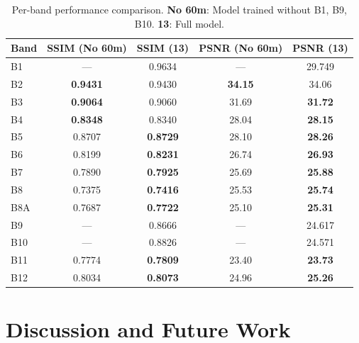\documentclass[remotesensing,article,submit,pdftex,moreauthors]{Definitions/mdpi}
\begin{document}
\begin{table}[!htbp]
    \centering
    \caption{Per-band performance comparison. \textbf{No 60m}: Model trained without B1, B9, B10. \textbf{13}: Full model.}
    \label{tab:ablation_excluding_60m_per_band}
    \begin{tabular}{lcccc}
    \toprule
    \textbf{Band} & \textbf{SSIM (No 60m)} & \textbf{SSIM (13)} & \textbf{PSNR (No 60m)} & \textbf{PSNR (13)} \\
    \midrule
    B1   & ---    & 0.9634 & ---    & 29.749 \\
    B2 & \textbf{0.9431} & 0.9430 & \textbf{34.15} & 34.06 \\
    B3 & \textbf{0.9064} & 0.9060 & 31.69 & \textbf{31.72} \\
    B4 & \textbf{0.8348} & 0.8340 & 28.04 & \textbf{28.15} \\
    B5 & 0.8707 & \textbf{0.8729} & 28.10 & \textbf{28.26} \\
    B6 & 0.8199 & \textbf{0.8231} & 26.74 & \textbf{26.93} \\
    B7 & 0.7890 & \textbf{0.7925} & 25.69 & \textbf{25.88} \\
    B8 & 0.7375 & \textbf{0.7416} & 25.53 & \textbf{25.74} \\
    B8A & 0.7687 & \textbf{0.7722} & 25.10 & \textbf{25.31} \\
    B9   & ---    & 0.8666 & ---    & 24.617 \\
    B10  & ---    & 0.8826 & ---    & 24.571 \\
    B11 & 0.7774 & \textbf{0.7809} & 23.40 & \textbf{23.73} \\
    B12 & 0.8034 & \textbf{0.8073} & 24.96 & \textbf{25.26} \\
    \bottomrule
    \end{tabular}
\end{table}

% 
\section{Discussion and Future Work}

\end{document}
